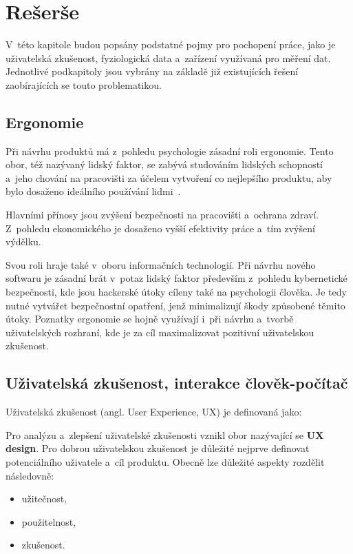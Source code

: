 
\chapter{Rešerše}
\label{reserse}

    V~této kapitole budou popsány podstatné pojmy pro pochopení práce, jako je uživatelská zkušenost, fyziologická data a~zařízení využívaná pro měření dat. Jednotlivé podkapitoly jsou vybrány na základě již existujících řešení zaobírajících se touto problematikou.

    \section{Ergonomie}
    Při návrhu produktů má z~pohledu psychologie zásadní roli ergonomie. Tento obor, též nazývaný lidský faktor, se zabývá studováním lidských schopností a~jeho chování na pracovišti za účelem vytvoření co nejlepšího produktu, aby bylo dosaženo ideálního používání lidmi~\cite{wiki:ergonomie}. 
    
    Hlavními přínosy jsou zvýšení bezpečnosti na pracovišti a~ochrana zdraví. Z~pohledu ekonomického je dosaženo vyšší efektivity práce a~tím zvýšení výdělku. 
    
    Svou roli hraje také v~oboru informačních technologií. Při návrhu nového softwaru je zásadní brát v~potaz lidský faktor především z~pohledu kybernetické bezpečnosti, kde jsou hackerské útoky cíleny také na psychologii člověka. Je tedy nutné vytvářet bezpečnostní opatření, jenž minimalizují škody způsobené těmito útoky. Poznatky ergonomie se hojně využívají i~při návrhu a~tvorbě uživatelských rozhraní, kde je za cíl maximalizovat pozitivní uživatelskou zkušenost.
    
    \section{Uživatelská zkušenost, interakce člověk-počítač}
    \label{user_experience}
    Uživatelská zkušenost (angl. User Experience, UX) je definovaná jako: ~\cite{what_is_UX} 
    
    
    Pro analýzu a~zlepšení uživatelské zkušenosti vznikl obor nazývající se \textbf{UX design}. Pro dobrou uživatelskou zkušenost je důležité nejprve definovat potenciálního uživatele a~cíl produktu. Obecně lze důležité aspekty rozdělit následovně:
    \begin{itemize}
        \item užitečnost,
        \item použitelnost,
        \item zkušenost.
    \end{itemize}
    
